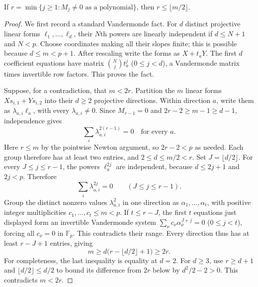\begin{lemma}
\label{lem:moment-first}
If $r=\min\{j\ge1:M_j\ne0\text{ as a polynomial}\}$, then
$r\le\lfloor m/2\rfloor$.
\end{lemma}
\begin{proof}
We first record a standard Vandermonde fact. For $d$ distinct projective
linear forms $\ell_1,\dots,\ell_d$, their $N$th powers are linearly independent
if $d\le N+1$ and $N<p$. Choose coordinates making all their slopes finite;
this is possible because $d\le m<p+1$. After rescaling write the forms as
$X+t_aY$. The first $d$ coefficient equations have matrix
$\binom Nj t_a^j$ ($0\le j<d$), a Vandermonde matrix times invertible row
factors. This proves the fact.

Suppose, for a contradiction, that $m<2r$. Partition the $m$ linear forms
$Xs_{i,1}+Ys_{i,2}$ into their $d\ge2$ projective directions. Within direction
$a$, write them as $\lambda_{a,i}\ell_a$, with every $\lambda_{a,i}\ne0$.
Since $M_{r-1}=0$ and $2r-2\ge m-1\ge d-1$, independence gives
\[
             \sum_i\lambda_{a,i}^{2(r-1)}=0
                         \quad\text{for every }a.
\]
Here $r\le m$ by the pointwise Newton argument, so $2r-2<p$ as needed.
Each group therefore has at least two entries, and $2\le d\le m/2<r$.
Set $J=\lfloor d/2\rfloor$. For every $J\le j\le r-1$, the powers
$\ell_a^{2j}$ are independent, because $d\le2j+1$ and $2j<p$. Therefore
\[
                 \sum_i\lambda_{a,i}^{2j}=0
                     \qquad(J\le j\le r-1).
\]
Group the distinct nonzero values $\lambda_{a,i}^2$ in one direction as
$\alpha_1,\dots,\alpha_t$, with positive integer multiplicities
$c_1,\dots,c_t\le m<p$. If $t\le r-J$, the first $t$ equations just displayed
form an invertible Vandermonde system
$\sum_\nu c_\nu\alpha_\nu^{J+j}=0$ ($0\le j<t$), forcing all $c_\nu=0$
in $\mathbb F_p$. This contradicts their range. Every direction thus has
at least $r-J+1$ entries, giving
\[
               m\ge d\bigl(r-\lfloor d/2\rfloor+1\bigr)\ge2r.
\]
For completeness, the last inequality is equality at $d=2$. For $d\ge3$,
use $r\ge d+1$ and $\lfloor d/2\rfloor\le d/2$ to bound its difference
from $2r$ below by $d^2/2-2>0$. This contradicts $m<2r$.
\end{proof}

